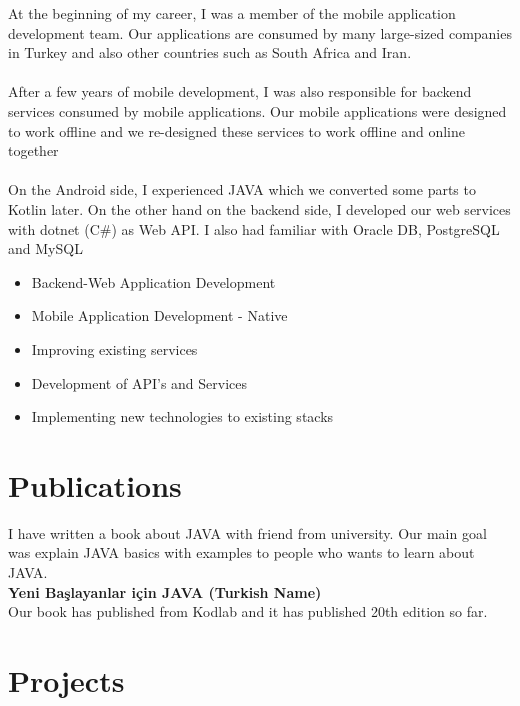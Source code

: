 \documentclass[11pt,a4paper,sans]{moderncv}
\begin{document}
{
	\textnormal
	{   
		At the beginning of my career, I was a member of the mobile application development team. Our applications are consumed by many large-sized companies in Turkey and also other countries such as South Africa and Iran.
		\\
		\\
		After a few years of mobile development, I was also responsible for backend services consumed by mobile applications. Our mobile applications were designed to work offline and we re-designed these services to work offline and online together
		\\
		\\
		On the Android side, I experienced JAVA which we converted some parts to Kotlin later. On the other hand on the backend side, I developed our web services with dotnet (C\#) as Web API. I also had familiar with Oracle DB, PostgreSQL and MySQL
	}
	\\
	\begin{itemize}%
		\item Backend-Web Application Development
		\item Mobile Application Development - Native
		\item Improving existing services
		\item Development of API's and Services
		\item Implementing new technologies to existing stacks
	\end{itemize}
}
\pagebreak

\section{Publications}
{
	I have written a book about JAVA with friend from university. Our main goal was explain JAVA basics with examples to people who wants to learn about JAVA. \\
	\textbf{Yeni Başlayanlar için JAVA (Turkish Name)} \\
	Our book has published from Kodlab and it has published 20th edition so far.
}

\section{Projects}
\end{document}
